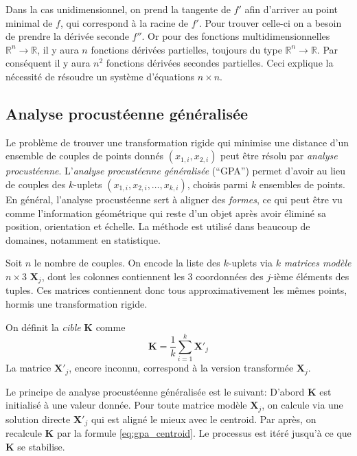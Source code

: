 \documentclass[a4paper,10pt]{scrreprt}
\begin{document}
Dans la cas unidimensionnel, on prend la tangente de $f'$ afin d'arriver au point minimal de $f$, qui correspond à la racine de $f'$. Pour trouver celle-ci on a besoin de prendre la dérivée seconde $f''$. Or pour des fonctions multidimensionnelles $\mathbb{R}^n \rightarrow \mathbb{R}$, il y aura $n$ fonctions dérivées partielles, toujours du type $\mathbb{R}^n \rightarrow \mathbb{R}$. Par conséquent il y aura $n^2$ fonctions dérivées secondes partielles. Ceci explique la nécessité de résoudre un système d'équations $n \times n$.

\subsection{Analyse procustéenne généralisée} \label{sec:procust}
Le problème de trouver une transformation rigide qui minimise une distance d'un ensemble de couples de points donnés ${(x_{1,i}, x_{2,i})}$ peut être résolu par \emph{analyse procustéenne}. L'\emph{analyse procustéenne généralisée} (``GPA'') permet d'avoir au lieu de couples des $k$-uplets ${(x_{1,i}, x_{2,i}, \ldots, x_{k,i})}$, choisis parmi $k$ ensembles de points. En général, l'analyse procustéenne sert à aligner des \emph{formes}, ce qui peut être vu comme l'information géométrique qui reste d'un objet après avoir éliminé sa position, orientation et échelle. La méthode est utilisé dans beaucoup de domaines, notamment en statistique.

Soit $n$ le nombre de couples. On encode la liste des $k$-uplets via $k$ \emph{matrices modèle} $n \times 3$ $\mathbf{X}_j$, dont les colonnes contiennent les $3$ coordonnées des $j$-ième éléments des tuples. Ces matrices contiennent donc tous approximativement les mêmes points, hormis une transformation rigide.

On définit la \emph{cible} $\mathbf{K}$ comme
\begin{equation} \label{eq:gpa_centroid}
	\mathbf{K} = \frac{1}{k} \sum_{i=1}^{k} \mathbf{X'}_j 
\end{equation}
La matrice $\mathbf{X'}_j$, encore inconnu, correspond à la version transformée $\mathbf{X}_j$.

Le principe de analyse procustéenne généralisée est le suivant: D'abord $\mathbf{K}$ est initialisé à une valeur donnée. Pour toute matrice modèle $\mathbf{X}_j$, on calcule via une solution directe $\mathbf{X'}_j$ qui est aligné le mieux avec le centroid. Par après, on recalcule $\mathbf{K}$ par la formule \ref{eq:gpa_centroid}. Le processus est itéré jusqu'à ce que $\mathbf{K}$ se stabilise. \cite{Told2010}
\end{document}
